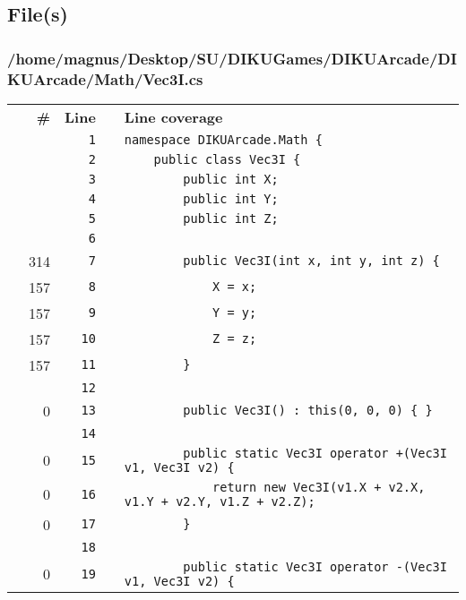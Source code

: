 \documentclass[a4paper,landscape,10pt]{article}
\begin{document}
\subsection{File(s)}
\subsubsection{/home/magnus/Desktop/SU/DIKUGames/DIKUArcade/DIKUArcade/Math/Vec3I.cs}
\begin{longtable}[l]{lrrll}
\textbf{} & \textbf{\#} & \textbf{Line} & \textbf{} & \textbf{Line coverage}\\
\cellcolor{gray} &  & \verb~1~ & & \verb~namespace DIKUArcade.Math {~\\
\cellcolor{gray} &  & \verb~2~ & & \verb~    public class Vec3I {~\\
\cellcolor{gray} &  & \verb~3~ & & \verb~        public int X;~\\
\cellcolor{gray} &  & \verb~4~ & & \verb~        public int Y;~\\
\cellcolor{gray} &  & \verb~5~ & & \verb~        public int Z;~\\
\cellcolor{gray} &  & \verb~6~ & & \verb~~\\
\cellcolor{green} & 314 & \verb~7~ & & \verb~        public Vec3I(int x, int y, int z) {~\\
\cellcolor{green} & 157 & \verb~8~ & & \verb~            X = x;~\\
\cellcolor{green} & 157 & \verb~9~ & & \verb~            Y = y;~\\
\cellcolor{green} & 157 & \verb~10~ & & \verb~            Z = z;~\\
\cellcolor{green} & 157 & \verb~11~ & & \verb~        }~\\
\cellcolor{gray} &  & \verb~12~ & & \verb~~\\
\cellcolor{red} & 0 & \verb~13~ & & \verb~        public Vec3I() : this(0, 0, 0) { }~\\
\cellcolor{gray} &  & \verb~14~ & & \verb~~\\
\cellcolor{red} & 0 & \verb~15~ & & \verb~        public static Vec3I operator +(Vec3I v1, Vec3I v2) {~\\
\cellcolor{red} & 0 & \verb~16~ & & \verb~            return new Vec3I(v1.X + v2.X, v1.Y + v2.Y, v1.Z + v2.Z);~\\
\cellcolor{red} & 0 & \verb~17~ & & \verb~        }~\\
\cellcolor{gray} &  & \verb~18~ & & \verb~~\\
\cellcolor{red} & 0 & \verb~19~ & & \verb~        public static Vec3I operator -(Vec3I v1, Vec3I v2) {~\\

\end{longtable}
\end{document}
